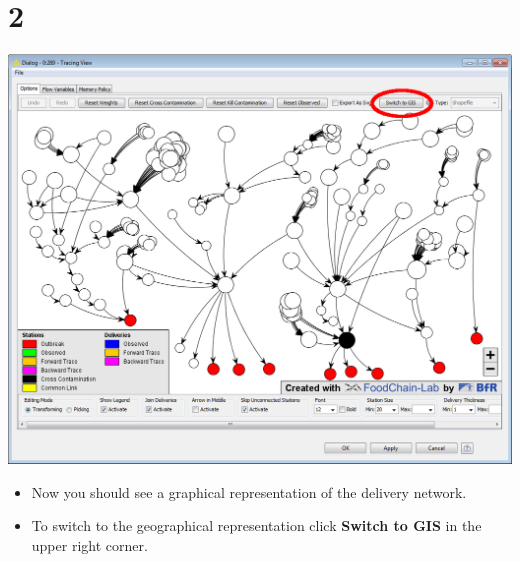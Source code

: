 \documentclass{beamer}
\begin{document}
\section{2}
\begin{frame}
	\begin{center}
  		\includegraphics[height=0.6\textheight]{2.png}
	\end{center}
	\begin{itemize}
		\item Now you should see a graphical representation of the delivery network.
		\item To switch to the geographical representation click \textbf{Switch to GIS} in the upper right corner.
	\end{itemize}
\end{frame}
\end{document}

